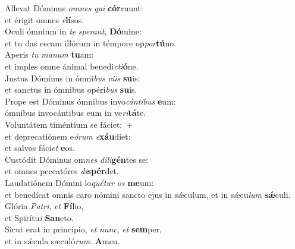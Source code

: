 \evenverse Allevat Dóminus \textit{om}\textit{nes} \textit{qui} \textbf{cór}ruunt:~\*\\
\evenverse et érigit omnes \textit{e}\textbf{lí}sos.\\
\oddverse Oculi ómnium in \textit{te} \textit{spe}\textit{rant}, \textbf{Dó}mine:~\*\\
\oddverse et tu das escam illórum in témpore op\textit{por}\textbf{tú}no.\\
\evenverse Aperis \textit{tu} \textit{ma}\textit{num} \textbf{tu}am:~\*\\
\evenverse et imples omne ánimal benedi\textit{cti}\textbf{ó}ne.\\
\oddverse Justus Dóminus in ómni\textit{bus} \textit{vi}\textit{is} \textbf{su}is:~\*\\
\oddverse et sanctus in ómnibus opéri\textit{bus} \textbf{su}is.\\
\evenverse Prope est Dóminus ómnibus invo\textit{cán}\textit{ti}\textit{bus} \textbf{e}um:~\*\\
\evenverse ómnibus invocántibus eum in ve\textit{ri}\textbf{tá}te.\\
\oddverse Voluntátem timéntium se fáciet:~+\\
\oddverse  et deprecatiónem e\textit{ó}\textit{rum} \textit{e}\textbf{xáu}diet:~\*\\
\oddverse et salvos fáci\textit{et} \textbf{e}os.\\
\evenverse Custódit Dóminus om\textit{nes} \textit{di}\textit{li}\textbf{gén}tes se:~\*\\
\evenverse et omnes peccatóres \textit{di}\textbf{spér}det.\\
\oddverse Laudatiónem Dómini lo\textit{qué}\textit{tur} \textit{os} \textbf{me}um:~\*\\
\oddverse et benedícat omnis caro nómini sancto ejus in sǽculum, et in sǽcu\textit{lum} \textbf{sǽ}culi.\\
\evenverse Glória \textit{Pa}\textit{tri}, \textit{et} \textbf{Fí}lio,~\*\\
\evenverse et Spirítu\textit{i} \textbf{San}cto.\\
\oddverse Sicut erat in princípio, \textit{et} \textit{nunc}, \textit{et} \textbf{sem}per,~\*\\
\oddverse et in sǽcula sæculó\textit{rum}. \textbf{A}men.\\
